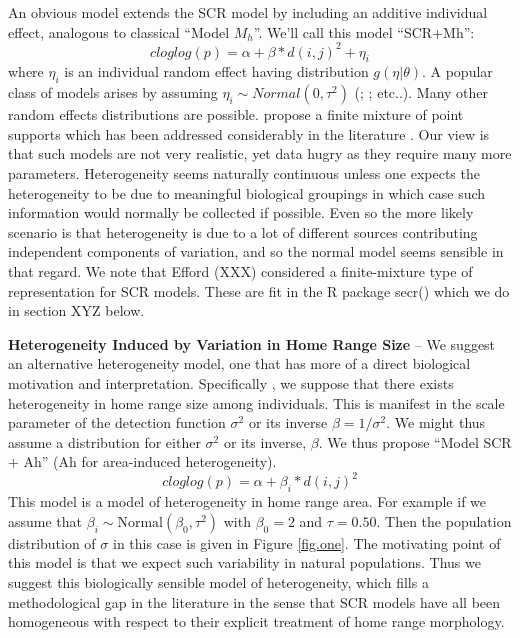 An obvious model extends the SCR model by including an additive individual effect, analogous to classical ``Model $M_{h}$''. We'll call this model ``SCR+Mh'': 
\[  
 cloglog(p) = \alpha + \beta*d(i,j)^2  + \eta_{i}
\]
where $\eta_{i}$ is an individual random effect having distribution
$g(\eta|\theta)$.  A popular class of models arises by assuming
$\eta_{i} \sim Normal(0,\tau^{2})$ (\citet{coull_agresti:1999};
\citet{dorazio_royle:2003}; etc..).  Many other random effects
distributions are possible. \citet{norris_pollock:1996} propose a
finite mixture of point supports which has been addressed considerably
in the literature \citep{pledger:2003; dorazio_royle:2003; link:2003}.  Our view is that such models are not very realistic, yet data hugry as they require many more parameters. Heterogeneity seems naturally continuous unless one expects the heterogeneity to be due to meaningful biological groupings in which case such information would normally be collected if possible.  Even so the more likely scenario is that heterogeneity is due to a lot of different sources contributing independent components of variation, and so the normal model seems sensible in that regard. We note that Efford (XXX) considered a finite-mixture type of representation for SCR models. These are fit in the R package secr() which we do in section XYZ below. 

{\bf Heterogeneity Induced by Variation in Home Range Size} -- We suggest an alternative heterogeneity model, one that has more of a direct biological motivation and interpretation. Specifically , we suppose that there exists heterogeneity in home range size among individuals. This is manifest in the scale parameter of the detection function $\sigma^{2}$ or its inverse $\beta = 1/\sigma^{2}$. We might
thus assume a distribution for either $\sigma^{2}$ or its inverse,
$\beta$.  We thus propose ``Model SCR + Ah'' (Ah for area-induced
heterogeneity).
\[
 cloglog(p) = \alpha + \beta_{i}*d(i,j)^2 
\]  
This model is a model of heterogeneity in home range area. For example
if we assume that $\beta_{i} \sim \mbox{Normal}(\beta_0,\tau^{2})$
with $\beta_{0} = 2$ and $\tau = 0.50$. Then the population
distribution of $\sigma$ in this case is given in Figure
\ref{fig.one}. The motivating point of this model is that we expect
such variability in natural populations. Thus we suggest this
biologically sensible model of heterogeneity, which fills a
methodological gap in the literature in the sense that SCR models have
all been homogeneous with respect to their explicit treatment of home
range morphology.


